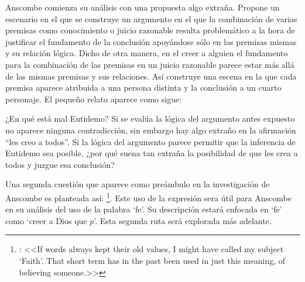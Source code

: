 Anscombe comienza su análisis con una propuesta algo extraña. Propone un escenario en el que se construye un argumento en el que la combinación de varias premisas como conocimiento o juicio razonable resulta problemático a la hora de justificar el fundamento de la conclusión apoyándose sólo en las premisas mismas y su relación lógica. Dicho de otra manera, en el creer a alguien el fundamento para la combinación de las premisas en un juicio razonable parece estar más allá de las mismas premisas y sus relaciones. Así construye una escena en la que cada premisa aparece atribuida a una persona distinta y la conclusión a un cuarto personaje. El pequeño relato aparece como sigue: 

¿En qué está mal Eutidemo? Si se evalúa la lógica del argumento antes expuesto
no aparece ninguna contradicción, sin embargo hay algo extraño en la afirmación
``les creo a todos''. Si la lógica del argumento parece permitir que la
inferencia de Eutidemo sea posible, ¿por qué suena tan extraña la posibilidad de
que les crea a todos y juzgue esa conclusión?

Una segunda cuestión que aparece como preámbulo en la investigación de Anscombe es planteada así: \footnote{\cite{anscombe2008faith:tobelieve}: <<If words always kept their old values, I might have called my subject `Faith'. That short term has in the past been used in just this meaning, of believing someone.>>}. Este uso de la expresión sera útil para Anscombe en su análisis del uso de la palabra `fe'. Su descripción estará enfocada en `fe' como `creer a Dios que $p$'. Esta segunda ruta será explorada más adelante.

